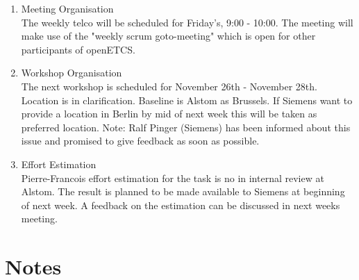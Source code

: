 \documentclass[a4paper, 11pt]{article}
\begin{document}
\begin{enumerate}

\item Meeting Organisation\\
The weekly telco will be scheduled for Friday's, 9:00 - 10:00. The meeting will make use of the "weekly scrum goto-meeting" which is open for other participants of openETCS.

\item Workshop Organisation\\
The next workshop is scheduled for November 26th - November 28th.
Location is in clarification. Baseline is Alstom as Brussels. If Siemens want to provide a  location in Berlin by mid of next week this will be taken as preferred location.
Note: Ralf Pinger (Siemens) has been informed about this issue and promised to give feedback as soon as possible.

\item Effort Estimation\\
Pierre-Francois effort estimation for the task is no in internal review at Alstom. The result is planned to be made available to Siemens at beginning of next week. A feedback on the estimation can be discussed in next weeks meeting.

\end{enumerate}


\section{Notes}
\end{document}

